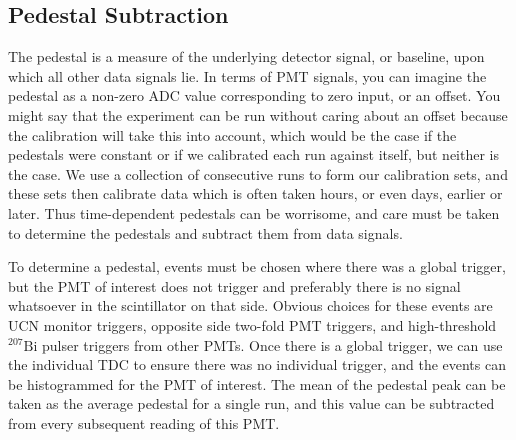 \subsection{Pedestal Subtraction} \label{ssec:pedSubtraction}
The pedestal is a measure of the underlying detector signal, or baseline, 
upon which all other data signals lie. In terms of PMT signals, you can imagine 
the pedestal as a non-zero ADC value corresponding to zero input, or an offset.
You might say that the experiment can be run without caring about an offset
because the calibration will take this into account, which would be the case 
if the pedestals were constant or if we calibrated each run against itself, but 
neither is the case. We use a collection of consecutive runs to form our 
calibration sets, and these sets then calibrate data which is often taken hours,
or even days, earlier or later. Thus time-dependent pedestals can be worrisome, and care
must be taken to determine the pedestals and subtract them from data signals.

To determine a pedestal, events must be chosen where there was a global trigger, but
the PMT of interest does not trigger and preferably there is no signal
whatsoever in the scintillator on that side. Obvious choices for these events are
UCN monitor triggers, opposite side two-fold PMT triggers, and high-threshold $^{207}\mathrm{Bi}$
pulser triggers from other PMTs. Once there is a global trigger, we can use the individual TDC
to ensure there was no individual trigger, and the events can be 
histogrammed for the PMT of interest. The mean of the pedestal
peak can be taken as the average pedestal for a single run,
and this value can be 
subtracted from every subsequent reading of this PMT.

